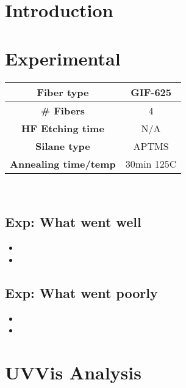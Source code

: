 \section{Introduction}

\section{Experimental}


\begin{center}
\begin{tabular}{| c | c |}
 \hline
 {\bf Fiber type} & GIF-625 \\ \hline
 {\bf \# Fibers} & 4  \\ \hline
 {\bf HF Etching time} & N/A \\ \hline
 {\bf Silane type} & APTMS \\ \hline
 {\bf Annealing time/temp} & 30min 125C  \\ \hline
\end{tabular}
\end{center}

\\


\subsection{Exp: What went well}

\begin{itemize}
\item{}
\item{}
\end{itemize}

\subsection{Exp: What went poorly}

\begin{itemize}
\item{}
\item{}
\end{itemize}

\section{UVVis Analysis}



